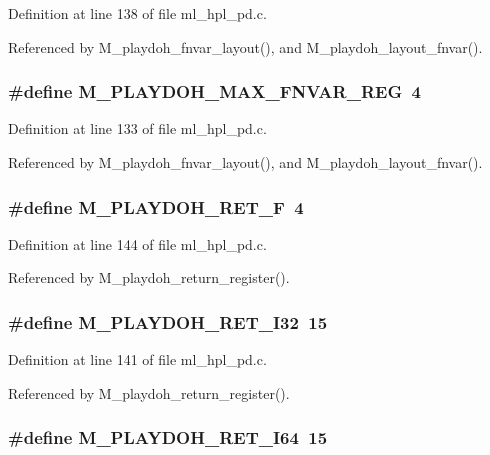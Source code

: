 Definition at line 138 of file ml\_\-hpl\_\-pd.c.

Referenced by M\_\-playdoh\_\-fnvar\_\-layout(), and M\_\-playdoh\_\-layout\_\-fnvar().
\subsubsection{\setlength{\rightskip}{0pt plus 5cm}\#define M\_\-PLAYDOH\_\-MAX\_\-FNVAR\_\-REG~4}\label{ml__hpl__pd_8c_e99e841bedfacb02282b56d15a814d56}




Definition at line 133 of file ml\_\-hpl\_\-pd.c.

Referenced by M\_\-playdoh\_\-fnvar\_\-layout(), and M\_\-playdoh\_\-layout\_\-fnvar().
\subsubsection{\setlength{\rightskip}{0pt plus 5cm}\#define M\_\-PLAYDOH\_\-RET\_\-F~4}\label{ml__hpl__pd_8c_8c6cc57a883e83680b51cc8bbe9dc03b}




Definition at line 144 of file ml\_\-hpl\_\-pd.c.

Referenced by M\_\-playdoh\_\-return\_\-register().
\subsubsection{\setlength{\rightskip}{0pt plus 5cm}\#define M\_\-PLAYDOH\_\-RET\_\-I32~15}\label{ml__hpl__pd_8c_b16fc7a6ba7112181bf6eef1edbb46c0}




Definition at line 141 of file ml\_\-hpl\_\-pd.c.

Referenced by M\_\-playdoh\_\-return\_\-register().
\subsubsection{\setlength{\rightskip}{0pt plus 5cm}\#define M\_\-PLAYDOH\_\-RET\_\-I64~15}\label{ml__hpl__pd_8c_23b1ab704e3ff0e06c62af59e577f83b}




